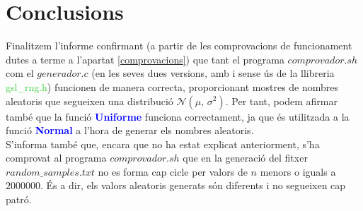 \documentclass[a4paper, 11pt]{article}
\begin{document}
\section{Conclusions}
Finalitzem l'informe confirmant (a partir de les comprovacions de funcionament dutes a terme a l'apartat \textcolor{blue}{\ref{comprovacions}}) que tant el programa $comprovador.sh$ com el $generador.c$ (en les seves dues versions, amb i sense ús de la llibreria \textcolor{LimeGreen}{gsl\_rng.h}) funcionen de manera correcta, proporcionant mostres de nombres aleatoris que segueixen una distribució $\mathcal{N}(\mu,\,\sigma^{2})$. Per tant, podem afirmar també que la funció \textbf{\textcolor{blue}{Uniforme}} funciona correctament, ja que és utilitzada a la funció \textbf{\textcolor{blue}{Normal}} a l'hora de generar els nombres aleatoris.\\
S'informa també que, encara que no ha estat explicat anteriorment, s'ha comprovat al programa $comprovador.sh$ que en la generació del fitxer $random\_samples.txt$ no es forma cap cicle per valors de $n$ menors o iguals a $2000000$. És a dir, els valors aleatoris generats són diferents i no segueixen cap patró.
\end{document}
